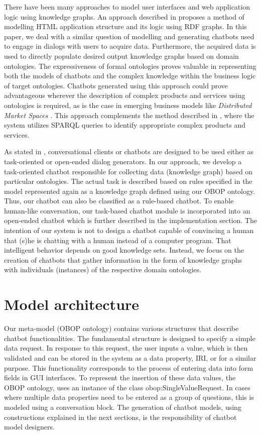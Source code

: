 \documentclass[runningheads]{llncs}
\begin{document}
There have been many approaches to model user interfaces and web application logic using knowledge graphs. An approach described in \cite{rutesic2021enhanced} proposes a method of modelling HTML application structure and its logic using RDF graphs.
In this paper, we deal with a similar question of modelling and generating chatbots used to engage in dialogs with users to acquire data. Furthermore, the acquired data is used to directly populate desired output knowledge graphs based on domain ontologies. The expressiveness of formal ontologies proves valuable in representing both the models of chatbots and the complex knowledge within the business logic of target ontologies.
Chatbots generated using this approach could prove advantageous wherever the description of complex products and services using ontologies is required, as is the case in emerging business models like {\itshape Distributed Market Spaces} \cite{radonjic2020arising}. This approach complements the method described in \cite{hitz2016generic}, where the system utilizes SPARQL queries to identify appropriate complex products and services.  

As stated in \cite{agarwal2020review}, conversational clients or chatbots are designed to be used either as task-oriented or open-ended dialog generators. In our approach, we develop a task-oriented chatbot responsible for collecting data (knowledge graph) based on particular ontologies. The actual task is described based on rules specified in the model represented again as a knowledge graph defined using our OBOP ontology. Thus, our chatbot can also be classified as a rule-based chatbot. To enable human-like conversation, our task-based chatbot module is incorporated into an open-ended chatbot which is further described in the implementation section. The intention of our system is not to design a chatbot capable of convincing a human that (s)he is chatting with a human instead of a computer program. That intelligent behavior depends on good knowledge sets. Instead, we focus on the creation of chatbots that gather information in the form of knowledge graphs with individuals (instances) of the respective domain ontologies.  



\section{Model architecture}
Our meta-model (OBOP ontology) contains various structures that describe chatbot functionalities. The fundamental structure is designed to specify a simple data request. In response to this request, the user inputs a value, which is then validated and can be stored in the system as a data property, IRI, or for a similar purpose. This functionality corresponds to the process of entering data into form fields in GUI interfaces. To represent the insertion of these data values, the OBOP ontology, uses an instance of the class obop:SingleValueRequest. In cases where multiple data properties need to be entered as a group of questions, this is modeled using a conversation block. The generation of chatbot models, using constructions explained in the next sections, is the responsibility of chatbot model designers.  
\end{document}
